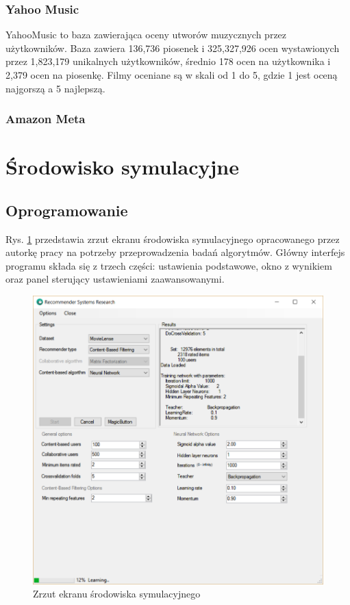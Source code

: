 \documentclass[twoside]{iisthesis}
\begin{document}
		\subsubsection{Yahoo Music}
			
			YahooMusic to baza zawierająca oceny utworów muzycznych przez użytkowników. Baza zawiera 136,736 piosenek i 325,327,926 ocen wystawionych przez 1,823,179 unikalnych użytkowników, średnio 178 ocen na użytkownika i 2,379 ocen na piosenkę. Filmy oceniane są w skali od 1 do 5, gdzie 1 jest oceną najgorszą a 5 najlepszą.
		
		
		
		\subsubsection{Amazon Meta}
		
		
			\cite{leskovec2007dynamics}
		
	\section{Środowisko symulacyjne}
	
		\subsection{Oprogramowanie}
	
		Rys. \ref{fig:program} przedstawia zrzut ekranu środowiska symulacyjnego opracowanego przez autorkę pracy na potrzeby przeprowadzenia badań algorytmów. Główny interfejs programu składa się z trzech części: ustawienia podstawowe, okno z wynikiem oraz panel sterujący ustawieniami zaawansowanymi. 
	
		\begin{figure}[!ht] 
			\centering
			\includegraphics[width=1\textwidth]{program}
			\caption{Zrzut ekranu środowiska symulacyjnego}
			\label{fig:program}
		\end{figure}
	
\end{document}

